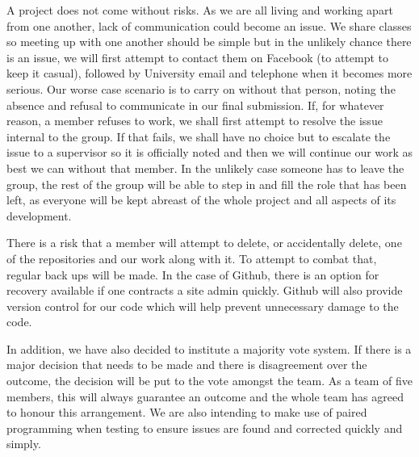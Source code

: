 \documentclass[11pt]{article}
\begin{document}
A project does not come without risks. As we are all living and
working apart from one another, lack of communication could become
an issue. We share classes so meeting up with one another should be
simple but in the unlikely chance there is an issue, we will first
attempt to contact them on Facebook (to attempt to keep it casual),
followed by University email and telephone when it becomes more
serious. Our worse case scenario is to carry on without that person,
noting the absence and refusal to communicate in our final
submission. If, for whatever reason, a member refuses to work, we
shall first attempt to resolve the issue internal to the group. If
that fails, we shall have no choice but to escalate the issue to a
supervisor so it is officially noted and then we will continue our
work as best we can without that member. In the unlikely case
someone has to leave the group, the rest of the group will be able
to step in and fill the role that has been left, as everyone will be
kept abreast of the whole project and all aspects of its
development.

There is a risk that a member will attempt to delete, or
accidentally delete, one of the repositories and our work along with
it. To attempt to combat that, regular back ups will be made. In the
case of Github, there is an option for recovery available if one
contracts a site admin quickly. Github will also provide version
control for our code which will help prevent unnecessary damage to
the code.

In addition, we have also decided to institute a majority vote
system. If there is a major decision that needs to be made and there
is disagreement over the outcome, the decision will be put to the
vote amongst the team. As a team of five members, this will always
guarantee an outcome and the whole team has agreed to honour this
arrangement. We are also intending to make use of paired programming
when testing to ensure issues are found and corrected quickly and
simply.
\end{document}
